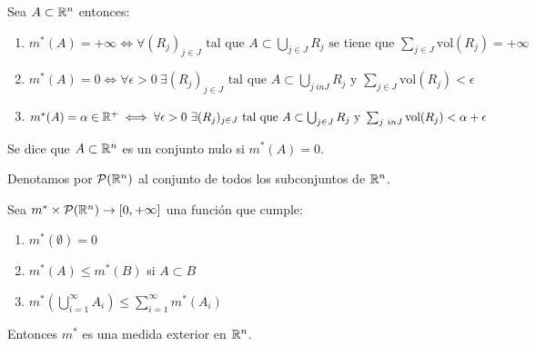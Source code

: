 \begin{observación}
Sea $A \subset \mathbb{R}^n$ entonces:
\vspace{-0.5em}
\begin{enumerate}
    \item $m^*(A) = +\infty \iff \forall (R_j)_{j \in J} \text{ tal que } A \subset \bigcup_{j \in J} R_j \text{ se tiene que } \sum_{j \in J} \text{vol}(R_j) = +\infty$
    \item $m^*(A) = 0 \iff \forall \epsilon > 0 \ \exists (R_j)_{j \in J} \text{ tal que } A \subset \bigcup_{j \ in J} R_j \text{ y } \sum_{j \in J} \text{vol}(R_j) < \epsilon$
    \item $m^*(A) = \alpha \in \mathbb{R}^+ \iff \forall \epsilon > 0 \ \exists (R_j)_{j \in J} \text{ tal que } A \subset \bigcup_{j \in J} R_j \text{ y } \sum_{j \ in J} \text{vol}(R_j) < \alpha + \epsilon$
\end{enumerate}
\end{observación}

\begin{definición}
Se dice que $A \subset \mathbb{R}^n$ es un conjunto nulo si $m^*(A) = 0$.
\end{definición}


Denotamos por $\mathcal{P}(\mathbb{R}^n)$ al conjunto de todos los subconjuntos de
$\mathbb{R}^n$.
\begin{teorema}
    Sea $m^* \times \mathcal{P}(\mathbb{R}^n) \to [0, +\infty]$ una función que cumple:
    \vspace{-0.5em}
    \begin{enumerate}
        \item $m^*(\emptyset) = 0$
        \item $m^*(A) \leq m^*(B)$ si $A \subset B$
        \item $m^*(\bigcup_{i=1}^\infty A_i) \leq \sum_{i=1}^\infty m^*(A_i)$
    \end{enumerate}
    Entonces $m^*$ es una medida exterior en $\mathbb{R}^n$.
\end{teorema}

